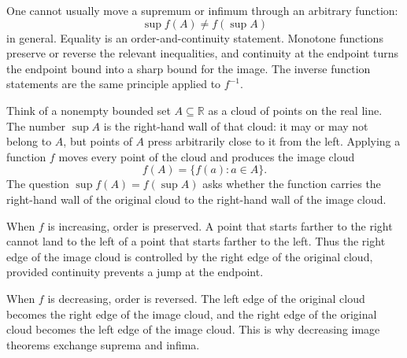 \begin{remark*}[Orientation]
One cannot usually move a supremum or infimum through an arbitrary function:
\[
  \sup f(A)\neq f(\sup A)
\]
in general.  Equality is an order-and-continuity statement.  Monotone functions
preserve or reverse the relevant inequalities, and continuity at the endpoint
turns the endpoint bound into a sharp bound for the image.  The inverse
function statements are the same principle applied to $f^{-1}$.
\end{remark*}

\begin{remark*}[Interpretation]
Think of a nonempty bounded set $A\subseteq\mathbb{R}$ as a cloud of points on
the real line.  The number $\sup A$ is the right-hand wall of that cloud: it
may or may not belong to $A$, but points of $A$ press arbitrarily close to it
from the left.  Applying a function $f$ moves every point of the cloud and
produces the image cloud
\[
  f(A)=\{f(a):a\in A\}.
\]
The question $\sup f(A)=f(\sup A)$ asks whether the function carries the
right-hand wall of the original cloud to the right-hand wall of the image
cloud.
\end{remark*}

\begin{example*}
\begin{center}

\end{center}
When $f$ is increasing, order is preserved.  A point that starts farther to the
right cannot land to the left of a point that starts farther to the left.  Thus
the right edge of the image cloud is controlled by the right edge of the
original cloud, provided continuity prevents a jump at the endpoint.
\end{example*}

\begin{example*}
\begin{center}

\end{center}
When $f$ is decreasing, order is reversed.  The left edge of the original cloud
becomes the right edge of the image cloud, and the right edge of the original
cloud becomes the left edge of the image cloud.  This is why decreasing image
theorems exchange suprema and infima.
\end{example*}

